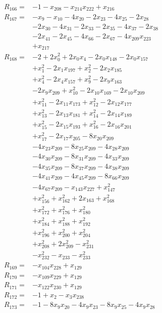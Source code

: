\begin{align*}
R_{166}={}&-1 -x_{208} -x_{214}x_{222} +x_{216}\\[3pt]
R_{167}={}&-x_{9} -x_{10} -4x_{20} -2x_{23} -4x_{25} -2x_{28}\\
&-2x_{30} -4x_{31} -2x_{33} -2x_{35} -4x_{37} -2x_{38}\\
&-2x_{41} -2x_{45} -4x_{66} -2x_{67} -4x_{209}x_{223}\\
&+x_{217}\\[3pt]
R_{168}={}&-2 +2x_{0}^{2} +2x_{0}x_{4} -2x_{0}x_{148} -2x_{0}x_{157}\\
&+x_{1}^{2} -2x_{1}x_{197} +x_{2}^{2} -2x_{2}x_{185}\\
&+x_{4}^{2} -2x_{4}x_{157} +x_{9}^{2} -2x_{9}x_{163}\\
&-2x_{9}x_{209} +x_{10}^{2} -2x_{10}x_{169} -2x_{10}x_{209}\\
&+x_{11}^{2} -2x_{11}x_{173} +x_{12}^{2} -2x_{12}x_{177}\\
&+x_{13}^{2} -2x_{13}x_{181} +x_{14}^{2} -2x_{14}x_{189}\\
&+x_{15}^{2} -2x_{15}x_{193} +x_{16}^{2} -2x_{16}x_{201}\\
&+x_{17}^{2} -2x_{17}x_{205} -8x_{20}x_{209}\\
&-4x_{23}x_{209} -8x_{25}x_{209} -4x_{28}x_{209}\\
&-4x_{30}x_{209} -8x_{31}x_{209} -4x_{33}x_{209}\\
&-4x_{35}x_{209} -8x_{37}x_{209} -4x_{38}x_{209}\\
&-4x_{41}x_{209} -4x_{45}x_{209} -8x_{66}x_{209}\\
&-4x_{67}x_{209} -x_{143}x_{227} +x_{147}^{2}\\
&+x_{156}^{2} +x_{162}^{2} +2x_{163} +x_{168}^{2}\\
&+x_{172}^{2} +x_{176}^{2} +x_{180}^{2}\\
&+x_{184}^{2} +x_{188}^{2} +x_{192}^{2}\\
&+x_{196}^{2} +x_{200}^{2} +x_{204}^{2}\\
&+x_{208}^{2} +2x_{209}^{2} -x_{231}^{2}\\
&-x_{232}^{2} -x_{233} -x_{233}^{2}\\[3pt]
R_{169}={}&-x_{104}x_{228} +x_{129}\\[3pt]
R_{170}={}&-x_{109}x_{229} +x_{129}\\[3pt]
R_{171}={}&-x_{122}x_{230} +x_{129}\\[3pt]
R_{172}={}&-1 +x_{2} -x_{3}x_{238}\\[3pt]
R_{173}={}&-1 -8x_{9}x_{20} -4x_{9}x_{23} -8x_{9}x_{25} -4x_{9}x_{28}\\

\end{align*}
